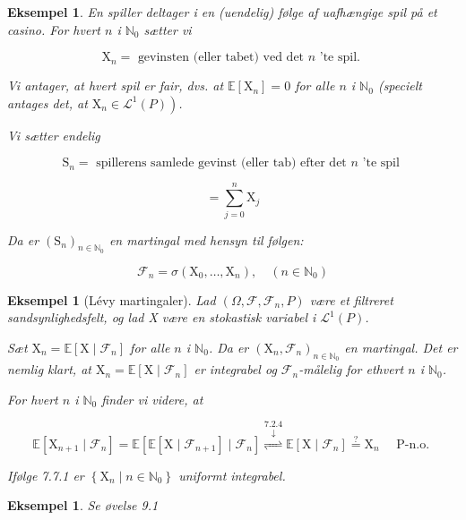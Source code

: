 \documentclass{article}
\newcommand{\1}{\mathbbm{1}}
\theoremstyle{boxed}
\newtheorem{example}[theorem]{Eksempel}
\begin{document}
\begin{example}
    En spiller deltager i en (uendelig) følge af uafhængige spil på et casino.
For hvert $n$ i $\mathbb{N}_0$ sætter vi

$$
\mathrm{X}_n=\text { gevinsten (eller tabet) ved det } n \text { 'te spil. }
$$


Vi antager, at hvert spil er fair, dvs. at $\mathbb{E}\left[\mathrm{X}_n\right]=0$ for alle $n$ i $\mathbb{N}_0$ (specielt antages det, at $\left.\mathrm{X}_n \in \mathcal{L}^1(P)\right)$.

Vi sætter endelig

$$
\mathrm{S}_n=\text { spillerens samlede gevinst (eller tab) efter det } n \text { 'te spil }
$$


$$
=\sum_{j=0}^n \mathrm{X}_j
$$


Da er $\left(\mathrm{S}_n\right)_{n \in \mathbb{N}_0}$ en martingal med hensyn til følgen:

$$
\mathcal{F}_n=\sigma\left(\mathrm{X}_0, \ldots, \mathrm{X}_n\right), \quad\left(n \in \mathbb{N}_0\right)
$$

\end{example}
\begin{example}[Lévy martingaler]
    Lad $\left(\Omega, \mathcal{F}, \mathcal{F}_n, P\right)$ være et filtreret sandsynlighedsfelt, og lad X være en stokastisk variabel i $\mathcal{L}^1(P)$.

Sæt $\mathrm{X}_n=\mathbb{E}\left[\mathrm{X} \mid \mathcal{F}_n\right]$ for alle $n$ i $\mathbb{N}_0$.
Da er $\left(\mathrm{X}_n, \mathcal{F}_n\right)_{n \in \mathbb{N}_0}$ en martingal.
Det er nemlig klart, at $\mathrm{X}_n=\mathbb{E}\left[\mathrm{X} \mid \mathcal{F}_n\right]$ er integrabel og $\mathcal{F}_n$-målelig for ethvert $n$ i $\mathbb{N}_0$.

For hvert $n$ i $\mathbb{N}_0$ finder vi videre, at

$$
\mathbb{E}\left[\mathrm{X}_{n+1} \mid \mathcal{F}_n\right]=\mathbb{E}\left[\mathbb{E}\left[\mathrm{X} \mid \mathcal{F}_{n+1}\right] \mid \mathcal{F}_n\right] \stackrel{7.2 .4}{\stackrel{\downarrow}{\rightleftharpoons}} \mathbb{E}\left[\mathrm{X} \mid \mathcal{F}_n\right] \stackrel{?}{=} \mathrm{X}_n \quad \text { P-n.o. }
$$


Ifølge 7.7.1 er $\left\{\mathrm{X}_n \mid n \in \mathbb{N}_0\right\}$ uniformt integrabel.
\end{example}
\begin{example}
Se øvelse 9.1
\end{example}
\end{document}
